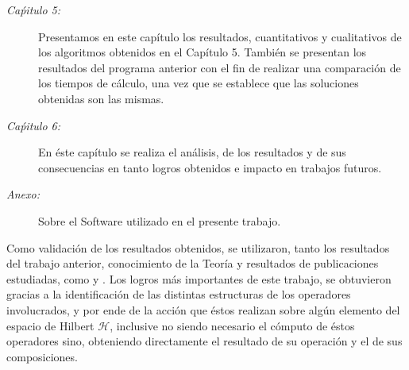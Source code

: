 \begin{description}
\item [\emph{Ca\'pitulo 5:} ] Presentamos en este cap\'itulo los resultados, cuantitativos y cualitativos de los algoritmos obtenidos en el Cap\'itulo  5. Tambi\'en se presentan los resultados del programa anterior con el fin de realizar una comparaci\'on de los tiempos de c\'alculo, una vez que se establece que las soluciones obtenidas son las mismas.
\item [\emph{Ca\'pitulo 6:} ] En \'este cap\'itulo se realiza el an\'alisis, de los resultados y de sus consecuencias en tanto logros obtenidos e impacto en trabajos futuros.
\item [\emph{Anexo:} ] Sobre el Software utilizado en el presente trabajo.
\end{description}

\quad Como validaci\'on de los resultados obtenidos, se utilizaron, tanto los resultados del trabajo anterior, conocimiento de la Teor\'ia y resultados de publicaciones estudiadas, como \cite{single-photon} y \cite{single-photon-walther}. Los logros m\'as importantes de este trabajo, se obtuvieron gracias a la identificaci\'on de las distintas estructuras de los operadores involucrados, y por ende de la acci\'on que \'estos realizan sobre alg\'un elemento del espacio de Hilbert $\mathcal{H}$, inclusive no siendo necesario el c\'omputo de \'estos operadores sino, obteniendo directamente el resultado de su operaci\'on y el de sus composiciones.